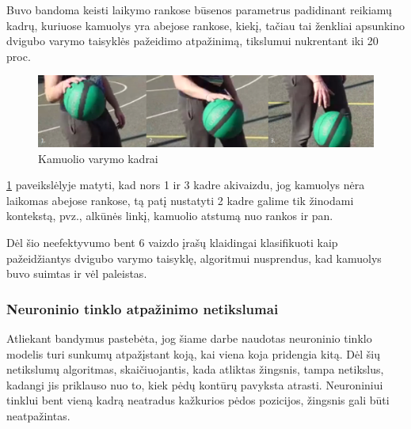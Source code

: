 \documentclass{VUMIFPSbakalaurinis}
\begin{document}
Buvo bandoma keisti laikymo rankose būsenos parametrus padidinant reikiamų kadrų, kuriuose kamuolys yra abejose rankose, kiekį, tačiau tai ženkliai apsunkino dvigubo varymo taisyklės pažeidimo atpažinimą, tikslumui nukrentant iki 20 proc.

\begin{figure}[H]
	\centering
	\includegraphics[scale=0.3]{img/double_dribble_fault.png}
	\caption{ Kamuolio varymo kadrai }
	\label{img:double_dribble_fault}
\end{figure}

\ref{img:double_dribble_fault} paveikslėlyje matyti, kad nors 1 ir 3 kadre akivaizdu, jog kamuolys nėra laikomas abejose rankose, tą patį nustatyti 2 kadre galime tik žinodami kontekstą, pvz., alkūnės linkį, kamuolio atstumą nuo rankos ir pan.  

Dėl šio neefektyvumo bent 6 vaizdo įrašų klaidingai klasifikuoti kaip pažeidžiantys dvigubo varymo taisyklę, algoritmui nusprendus, kad kamuolys buvo suimtas ir vėl paleistas. 

\subsubsection{Neuroninio tinklo atpažinimo netikslumai}

Atliekant bandymus pastebėta, jog šiame darbe naudotas neuroninio tinklo modelis turi sunkumų atpažįstant koją, kai viena koja pridengia kitą. Dėl šių netikslumų algoritmas, skaičiuojantis, kada atliktas žingsnis, tampa netikslus, kadangi jis priklauso nuo to, kiek pėdų kontūrų pavyksta atrasti. Neuroniniui tinklui bent vieną kadrą neatradus kažkurios pėdos pozicijos, žingsnis gali būti neatpažintas. 
\end{document}
